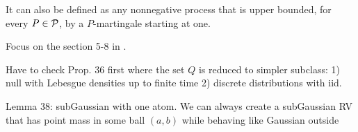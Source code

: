 It can also be defined as any nonnegative process that is upper bounded,
for every $P\in\mathcal{P}$, by a $P$-martingale starting at one.


Focus on the section 5-8 in \cite{ramdasAdmissibleAnytimevalidSequential2022}.

\begin{define}[Admissibiliy]
	
\end{define}

Have to check Prop. 36 first where the set $Q$ is reduced to simpler subclass:
1) null with Lebesgue densities up to finite time
2) discrete distributions with iid.

Lemma 38: subGaussian with one atom. We can always create a subGaussian 
RV that has point mass in some ball $(a,b)$ while behaving like 
Gaussian outside